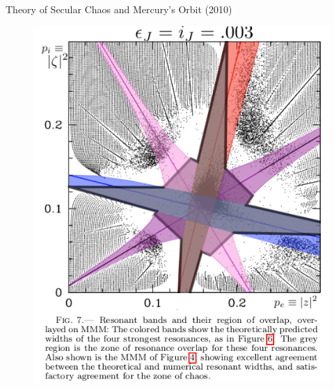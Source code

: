 \documentclass{beamer}
\begin{document}
\begin{frame}{Theory of Secular Chaos and Mercury's Orbit (2010)}
\begin{figure}[h]
\begin{minipage}[h]{0.65\linewidth}
\includegraphics[width=1\linewidth]{./10_5.png}
\end{minipage}
\end{figure}
\end{frame}
\end{document}
